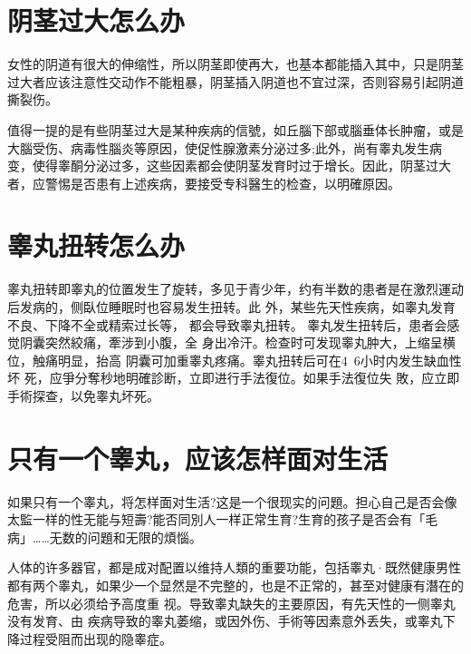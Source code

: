 \documentclass[12pt,UTF8]{ctexbook}
\begin{document}
\section{阴茎过大怎么办}

女性的阴道有很大的伸缩性，所以阴茎即使再大，也基本都能插入其中，只是阴茎过大者应该注意性交动作不能粗暴，阴茎插入阴道也不宜过深，否则容易引起阴道撕裂伤。

值得一提的是有些阴茎过大是某种疾病的信號，如丘腦下部或腦垂体长肿瘤，或是大腦受伤、病毒性腦炎等原因，使促性腺激素分泌过多;此外，尚有睾丸发生病变，使得睾酮分泌过多，这些因素都会使阴茎发育时过于增长。因此，阴茎过大者，应警惕是否患有上述疾病，要接受专科醫生的检查，以明確原因。

\section{睾丸扭转怎么办}

睾丸扭转即睾丸的位置发生了旋转，多见于青少年，约有半数的患者是在激烈運动后发病的，侧臥位睡眠时也容易发生扭转。此
外，某些先天性疾病，如睾丸发育不良、下降不全或精索过长等，
都会导致睾丸扭转。
睾丸发生扭转后，患者会感觉阴囊突然絞痛，牽涉到小腹，全
身出冷汗。检查时可发现睾丸肿大，上缩呈横位，触痛明显，抬高
阴囊可加重睾丸疼痛。睾丸扭转后可在4~6小时内发生缺血性坏
死，应爭分奪秒地明確診断，立即进行手法復位。如果手法復位失
敗，应立即手術探查，以免睾丸坏死。

\section{只有一个睾丸，应该怎样面对生活}

如果只有一个睾丸，将怎样面对生活?这是一个很现实的问題。担心自己是否会像太監一样的性无能与短壽?能否同別人一样正常生育?生育的孩子是否会有「毛病」……无数的问題和无限的煩惱。

人体的许多器官，都是成对配置以维持人類的重要功能，包括睾丸·既然健康男性都有两个睾丸，如果少一个显然是不完整的，也是不正常的，甚至对健康有潛在的危害，所以必须给予高度重
视。导致睾丸缺失的主要原因，有先天性的一侧睾丸没有发育、由
疾病导致的睾丸萎缩，或因外伤、手術等因素意外丢失，或睾丸下
降过程受阻而出现的隐睾症。
\end{document}
